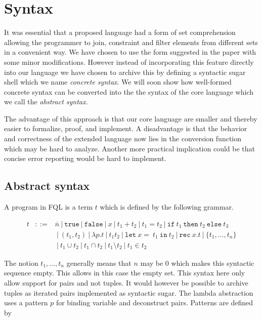 \documentclass[a4paper]{article}
\newcommand{\buzz}[1]{{\sl #1}}
\newcommand{\pipe}{\ | \ }
\newcommand{\s}[1]{\mathtt{#1}}
\newcommand{\sn}{\overline{n}}
\newcommand{\sLb}{\s{\{}}
\newcommand{\sRb}{\s{\}}}
\newcommand{\sif}{\s{if\ }}
\newcommand{\sthen}{\s{\ then\ }}
\newcommand{\selse}{\s{\ else\ }}
\newcommand{\sifthenelse}[3]{\sif #1 \sthen #2 \selse #3}
\newcommand{\sletin}[2]{\s{let\ } #1 \s{\ in\ } #2}
\newcommand{\srec}{\s{rec\ }}
\newcommand{\strue}{\s{true}}
\newcommand{\sfalse}{\s{false}}
\newcommand{\seq}{\s{=\ }}
\newcommand{\sset}[1]{\sLb #1 \sRb}
\begin{document}
\section{Syntax}
\label{sec:syntax}

It was essential that a proposed language had a form of set comprehension allowing the programmer to join, constraint and filter elements from different sets in a convenient way. We have chosen to use the form suggested in the paper with some minor modifications. However instead of incorporating this feature directly into our language we have chosen to archive this by defining a syntactic sugar shell which we name \buzz{concrete syntax}. We will soon show how well-formed concrete syntax can be converted into the the syntax of the core language which we call the \buzz{abstract syntax}.

The advantage of this approach is that our core language are smaller and thereby easier to formalize, proof, and implement. A disadvantage is that the behavior and correctness of the extended language now lies in the conversion function which may be hard to analyze. Another more practical implication could be that concise error reporting would be hard to implement.

\subsection{Abstract syntax}
\label{abstractSyntax}

A program in FQL is a term $t$ which is defined by the following grammar.

\begin{eqnarray*}
t & ::= & \sn \pipe \strue \pipe \sfalse \pipe x \pipe t_1 + t_2 \pipe t_1
= t_2 \pipe \sifthenelse{t_1}{t_2}{t_3} \\
& & \pipe (t_1,
t_2) \pipe \lambda p.t \pipe t_1 t_2 \pipe \sletin{x \seq t_1}{t_2}
\pipe \srec x.t \pipe \sset{t_1,\ldots,t_n}\\
& & \pipe t_1 \cup t_2 \pipe t_1 \cap t_2 \pipe t_1 \setminus t_2 \pipe t_1 \in t_2
\end{eqnarray*}

The notion $t_1,\ldots,t_n$ generally means that $n$ may be $0$ which
makes this syntactic sequence empty. This allows in this case the
empty set. This syntax here only allow support for pairs and not
tuples. It would however be possible to archive tuples as iterated
pairs implemented as syntactic sugar. The lambda abstraction uses a pattern $p$ for binding variable and deconstruct pairs. Patterns are defined by
\end{document}
